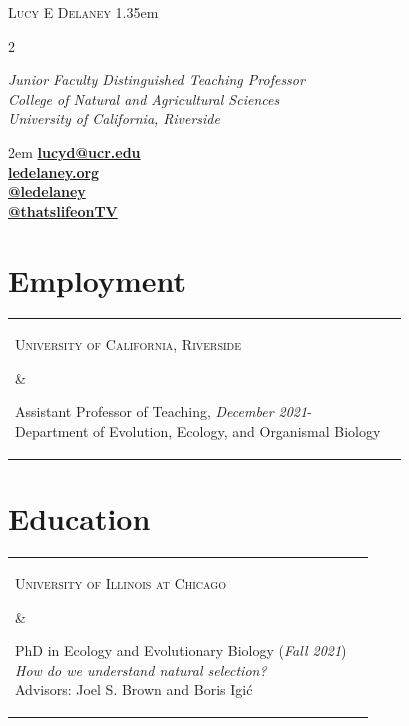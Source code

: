 \documentclass[]{article}
\begin{document}
\BgThispage
\pagestyle{alldocument}

{\fontsize{20}{64}\selectfont \textsc{Lucy E Delaney}}
\leftskip 1.35em
\begin{multicols}{2}

\textit{Junior Faculty Distinguished Teaching Professor}\\
\textit{College of Natural and Agricultural Sciences}\\
\textit{University of California, Riverside}

\columnbreak

\begin{flushright}
\rightskip 2em
\href{mailto:lucyd@ucr.edu}{\textbf{lucyd@ucr.edu}} \faEnvelopeOpen\\
\href{https://ledelaney.org}{\textbf{ledelaney.org}} \faMousePointer \\
\href{https://github.com/ledelaney}{\textbf{@ledelaney}} \faGithub\\
\href{https://www.youtube.com/@thatslifeonTV}{\textbf{@thatslifeonTV}} \faYoutube
\end{flushright}

\end{multicols}

\vspace{3mm}

\section{\fontsize{16}{48}\selectfont Employment}

\begin{tabular}{l | l}
\parbox{0.30\textwidth}{
\begin{center}
\textsc{University of California, Riverside}
\end{center}
}
&
\parbox{0.65\textwidth}{
Assistant Professor of Teaching, \textit{December 2021}-\\
Department of Evolution, Ecology, and Organismal Biology}
\end{tabular}

\vspace{4mm}
\section{\fontsize{16}{48}\selectfont Education}

\begin{tabular}{l | l}
\parbox{0.30\textwidth}{
\begin{center}
\textsc{University of Illinois at Chicago}
\end{center}
}
&
\parbox{0.65\textwidth}{
PhD in Ecology and Evolutionary Biology (\textit{Fall 2021})\\
\textit{How do we understand natural selection?}\\
Advisors: Joel S. Brown and Boris Igi\'c}
\end{tabular}
\end{document}
